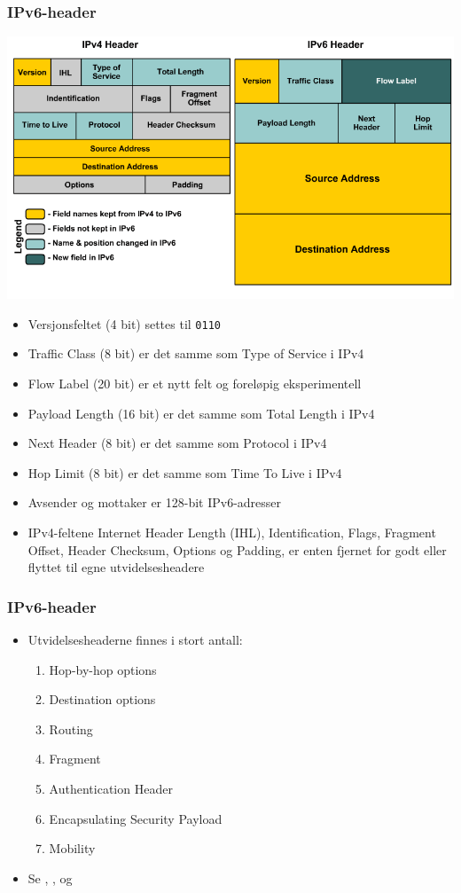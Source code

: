 \begin{frame}%
  \frametitle{IPv6-header}
  \begin{multicols}{2}
    \includegraphics[scale=.2]{CCNP-108.png}

    \begin{itemize}[<+->]
    \item Versjonsfeltet (4 bit) settes til \texttt{0110}
    \item Traffic Class (8 bit) er det samme som Type of Service i
      IPv4
    \item Flow Label (20 bit) er et nytt felt og foreløpig
      eksperimentell
    \item Payload Length (16 bit) er det samme som Total Length i IPv4
    \item Next Header (8 bit) er det samme som Protocol i IPv4
    \item Hop Limit (8 bit) er det samme som Time To Live i IPv4
    \item Avsender og mottaker er 128-bit IPv6-adresser
    \item IPv4-feltene Internet Header Length (IHL), Identification,
      Flags, Fragment Offset, Header Checksum, Options og Padding, er
      enten fjernet for godt eller flyttet til egne utvidelsesheadere
    \end{itemize}
  \end{multicols}
\end{frame}

\begin{frame}%
  \frametitle{IPv6-header}
  \begin{itemize}[<+->]
  \item Utvidelsesheaderne finnes i stort antall:
    \begin{enumerate}[<+->]
    \item Hop-by-hop options
    \item Destination options
    \item Routing
    \item Fragment
    \item Authentication Header
    \item Encapsulating Security Payload
    \item Mobility
    \end{enumerate}
  \item Se , ,  og 
  \end{itemize}
\end{frame}

